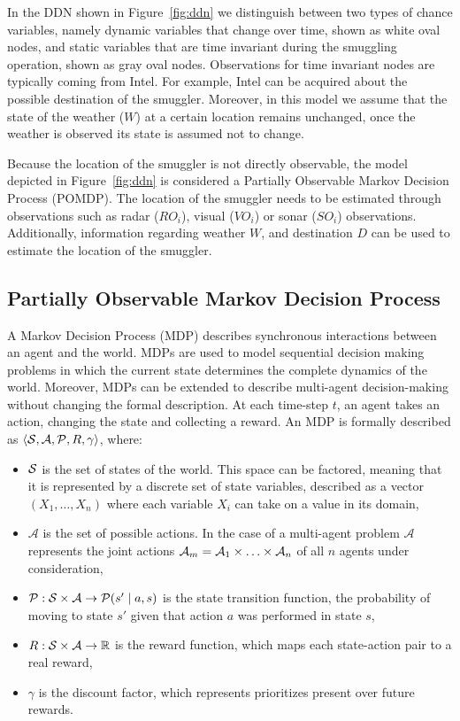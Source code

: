 \documentclass[conference]{IEEEtran}
\begin{document}
In the DDN shown in Figure~\ref{fig:ddn} we distinguish between two types of chance variables, namely dynamic variables that change over time, shown as white oval nodes, and static variables that are time invariant during the smuggling operation, shown as gray oval nodes. Observations for time invariant nodes are typically coming from Intel. For example, Intel can be acquired about the possible destination of the smuggler. Moreover, in this model we assume that the state of the weather ($W$) at a certain location remains unchanged, \ie once the weather is observed its state is assumed not to change.

Because the location of the smuggler is not directly observable, the model depicted in Figure~\ref{fig:ddn} is considered a Partially Observable Markov Decision Process (POMDP). The location of the smuggler needs to be estimated through observations such as radar ($RO_i$), visual ($VO_i$) or sonar ($SO_i$) observations. Additionally, information regarding weather $W$, and destination $D$ can be used to estimate the location of the smuggler.

\subsection{Partially Observable Markov Decision Process}
\label{sub:pomdp}

A Markov Decision Process (MDP) \cite{bellman1957dynamic,mdp} describes synchronous interactions between an agent and the world. MDPs are used to model sequential decision making problems in which the current state determines the complete dynamics of the world. Moreover, MDPs can be extended to describe multi-agent decision-making without changing the formal description. At each time-step $t$, an agent takes an action, changing the state and collecting a reward. An MDP is formally described as $\langle\S,\mathcal{A},\P,R,\gamma\rangle$, where:

\begin{itemize}
\item $\S$ is the set of states of the world. This space can be factored, meaning that it is represented by a discrete set of state variables, described as a vector $\left(X_1,\ldots,X_n\right)$ where each variable $X_i$ can take on a value in its domain,
\item $\mathcal{A}$ is the set of possible actions. In the case of a multi-agent problem $\mathcal{A}$ represents the joint actions $\A_{m} = \A_1\times\ldots\times\A_n$ of all $n$ agents under consideration,
\item $\P:\S\times\mathcal{A}\to\P(s'\mid a,s)$ is the state transition function, \ie the probability of moving to state $s'$ given that action $a$ was performed in state $s$,
\item $R:\S\times\mathcal{A}\to\mathbb{R}$ is the reward function, which maps each state-action pair to a real reward,
\item $\gamma$ is the discount factor, which represents prioritizes present over future rewards.
\end{itemize}
\end{document}
